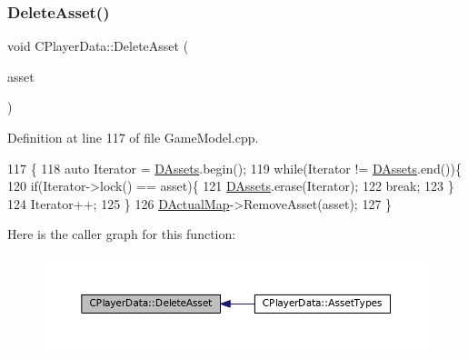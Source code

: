 \subsubsection{\texorpdfstring{Delete\+Asset()}{DeleteAsset()}}
{\footnotesize\ttfamily void C\+Player\+Data\+::\+Delete\+Asset (\begin{DoxyParamCaption}\item[{std\+::shared\+\_\+ptr$<$ \hyperlink{classCPlayerAsset}{C\+Player\+Asset} $>$}]{asset }\end{DoxyParamCaption})}



Definition at line 117 of file Game\+Model.\+cpp.


\begin{DoxyCode}
117                                                                 \{
118     \textcolor{keyword}{auto} Iterator = \hyperlink{classCPlayerData_a1d7dd355facf52db6242e3554373906c}{DAssets}.begin();
119     \textcolor{keywordflow}{while}(Iterator != \hyperlink{classCPlayerData_a1d7dd355facf52db6242e3554373906c}{DAssets}.end())\{
120         \textcolor{keywordflow}{if}(Iterator->lock() == asset)\{
121             \hyperlink{classCPlayerData_a1d7dd355facf52db6242e3554373906c}{DAssets}.erase(Iterator);
122             \textcolor{keywordflow}{break};
123         \}
124         Iterator++;
125     \}
126     \hyperlink{classCPlayerData_a943801106af1d7ad52abd73d32552186}{DActualMap}->RemoveAsset(asset);
127 \}
\end{DoxyCode}
Here is the caller graph for this function\+:
\nopagebreak
\begin{figure}[H]
\begin{center}
\leavevmode
\includegraphics[width=350pt]{classCPlayerData_a24f56e033f6d68ceba0f876d854201f0_icgraph}
\end{center}
\end{figure}
\hypertarget{classCPlayerData_ac43ee660aa07b2d9d96eb5285d50fab5}{}\label{classCPlayerData_ac43ee660aa07b2d9d96eb5285d50fab5} 
